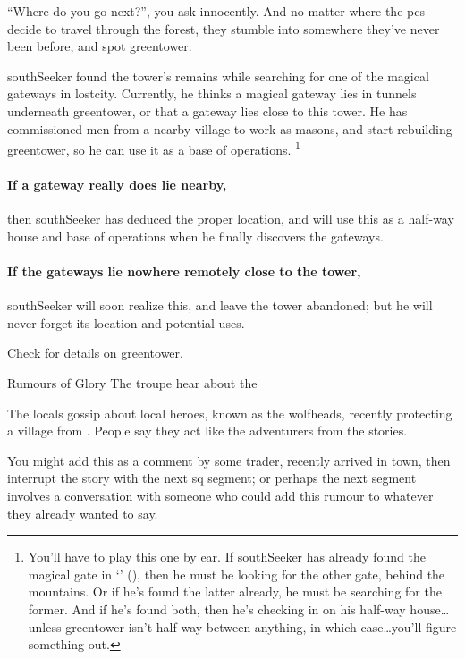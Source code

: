 ``Where do you go next?'', you ask innocently.
And no matter where the \glspl{pc} decide to travel through the forest, they stumble into somewhere they've never been before, and spot \gls{greentower}.

\begin{exampletext}
  \Gls{southSeeker} found the tower's remains while searching for one of the magical gateways in \gls{lostcity}.
  Currently, he thinks a magical gateway lies in tunnels underneath \gls{greentower}, or that a gateway lies close to this tower.
  He has commissioned men from a nearby \gls{village} to work as masons, and start rebuilding \gls{greentower}, so he can use it as a base of operations.%
  \footnote{You'll have to play this one by ear.
  If \gls{southSeeker} has already found the magical gate in `' (), then he must be looking for the other gate, behind the mountains.
  Or if he's found the latter already, he must be searching for the former.
  And if he's found both, then he's checking in on his half-way house\ldots unless \gls{greentower} isn't half way between anything, in which case\ldots you'll figure something out.}
\end{exampletext}

\paragraph{If a gateway really does lie nearby,}
then \gls{southSeeker} has deduced the proper location, and will use this as a half-way house and base of operations when he finally discovers the gateways.

\paragraph{If the gateways lie nowhere remotely close to the tower,}
\gls{southSeeker} will soon realize this, and leave the tower abandoned; but he will never forget its location and potential uses.

Check  for details on \gls{greentower}.

{\squash Rumours of Glory}%
{The troupe hear about the }%

The locals gossip about local heroes, known as the \glspl{wolfhead}, recently protecting a \gls{village} from .
People say they act like the adventurers from the stories.

You might add this as a comment by some trader, recently arrived in town, then interrupt the story with the next \gls{sq} \gls{segment}; or perhaps the next \gls{segment} involves a conversation with someone who could add this rumour to whatever they already wanted to say.

